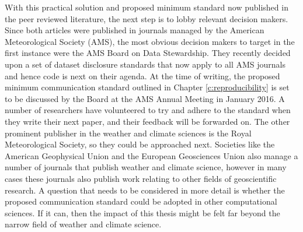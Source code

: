 With this practical solution \citep{IrvingSimmonds2015} and proposed minimum standard \citep{IrvingBAMS2016} now published in the peer reviewed literature, the next step is to lobby relevant decision makers. Since both articles were published in journals managed by the American Meteorological Society (AMS), the most obvious decision makers to target in the first instance were the AMS Board on Data Stewardship. They recently decided upon a set of dataset disclosure standards that now apply to all AMS journals \citep{Mayernik2015} and hence code is next on their agenda. At the time of writing, the proposed minimum communication standard outlined in Chapter \ref{c:reproducibility} is set to be discussed by the Board at the AMS Annual Meeting in January 2016. A number of researchers have volunteered to try and adhere to the standard when they write their next paper, and their feedback will be forwarded on. The other prominent publisher in the weather and climate sciences is the Royal Meteorological Society, so they could be approached next. Societies like the American Geophysical Union and the European Geosciences Union also manage a number of journals that publish weather and climate science, however in many cases these journals also publish work relating to other fields of geoscientific research. A question that needs to be considered in more detail is whether the proposed communication standard could be adopted in other computational sciences. If it can, then the impact of this thesis might be felt far beyond the narrow field of weather and climate science. 

